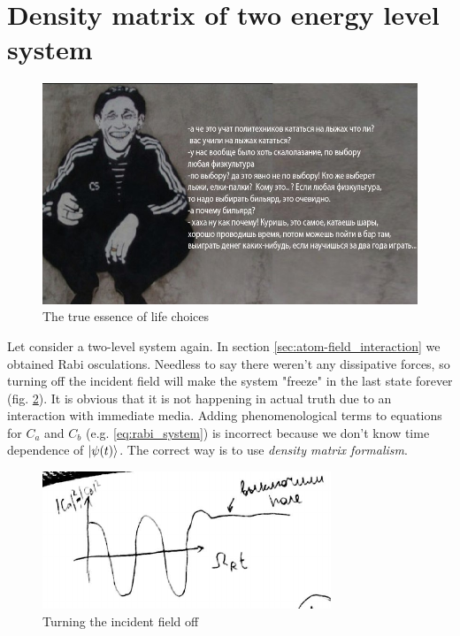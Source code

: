 \section{Density matrix of two energy level system}

\begin{figure}[h!]
	\centering
	\includegraphics[width=0.8\linewidth]{fig/L4/true_Baiko}
	\caption{The true essence of life choices}
	\label{fig:truebaiko}
\end{figure}

Let consider a two-level system again. In section \ref{sec:atom-field_interaction} we obtained Rabi osculations. Needless to say there weren't any dissipative forces, so turning off the incident field will make the system "freeze" in the last state forever (fig. \ref{fig:turnofffield}). It is obvious that it is not happening in actual truth due to an interaction with immediate media. Adding phenomenological terms to equations for $C_a$ and $C_b$ (e.g. \eqref{eq:rabi_system}) is incorrect because we don't know time dependence of $\left\lvert {\psi(t)} \right\rangle$. The correct way is to use \textit{density matrix formalism}.

\begin{figure}[h!]
	\centering
	\includegraphics[width=0.65\linewidth]{fig/L5/turn_off_field}
	\caption{Turning the incident field off}
	\label{fig:turnofffield}
\end{figure}


